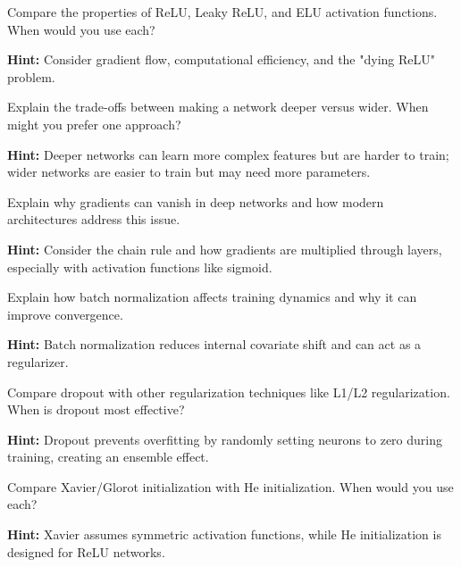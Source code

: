 \begin{problem}
Compare the properties of ReLU, Leaky ReLU, and ELU activation functions. When would you use each?

\textbf{Hint:} Consider gradient flow, computational efficiency, and the "dying ReLU" problem.
\end{problem}

\begin{problem}
Explain the trade-offs between making a network deeper versus wider. When might you prefer one approach?

\textbf{Hint:} Deeper networks can learn more complex features but are harder to train; wider networks are easier to train but may need more parameters.
\end{problem}

\begin{problem}
Explain why gradients can vanish in deep networks and how modern architectures address this issue.

\textbf{Hint:} Consider the chain rule and how gradients are multiplied through layers, especially with activation functions like sigmoid.
\end{problem}

\begin{problem}
Explain how batch normalization affects training dynamics and why it can improve convergence.

\textbf{Hint:} Batch normalization reduces internal covariate shift and can act as a regularizer.
\end{problem}

\begin{problem}
Compare dropout with other regularization techniques like L1/L2 regularization. When is dropout most effective?

\textbf{Hint:} Dropout prevents overfitting by randomly setting neurons to zero during training, creating an ensemble effect.
\end{problem}

\begin{problem}
Compare Xavier/Glorot initialization with He initialization. When would you use each?

\textbf{Hint:} Xavier assumes symmetric activation functions, while He initialization is designed for ReLU networks.
\end{problem}


